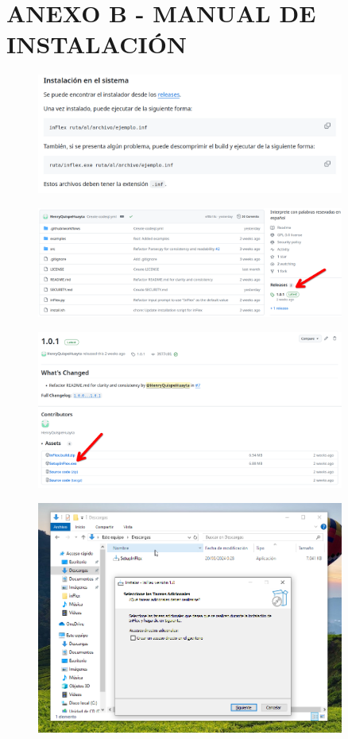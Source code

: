 \section*{ANEXO B - MANUAL DE INSTALACIÓN}
\begin{figure}[!h]
  \includegraphics*[width=0.9\textwidth]{images/apb01.png}
\end{figure}
\begin{figure}[!h]
  \includegraphics*[width=0.9\textwidth]{images/apb02.png}
\end{figure}
\begin{figure}[!h]
  \includegraphics*[width=0.9\textwidth]{images/apb03.png}
\end{figure}
\begin{figure}[!h]
  \includegraphics*[width=0.9\textwidth]{images/apb04.png}
\end{figure}
